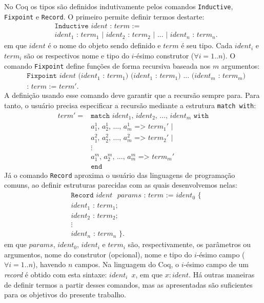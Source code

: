 No Coq os tipos são definidos indutivamente pelos comandos \texttt{Inductive}, \texttt{Fixpoint} e \texttt{Record}. O primeiro permite definir termos destarte: \begin{align*}
&\texttt{Inductive $ident$ : $term$ :=}\\ &\texttt{$ident_1$ : $term_1$ | $ident_2$ : $term_2$ | $...$ | $ident_n$ : $term_n$.}
\end{align*} em que $ident$ é o nome do objeto sendo definido e $term$ é seu tipo. Cada $ident_i$ e $term_i$ são os respectivos nome e tipo do $i$-ésimo construtor ($\forall i=1..n$). O comando \texttt{Fixpoint} define funções de forma recursiva baseada nos $m$ argumentos: \begin{align*}
&\texttt{Fixpoint $ident$ ($ident_1$ : $term_1$) ($ident_1$ : $term_1$) $...$ ($ident_m$ : $term_m$)}\\&\texttt{: $term$ := $term'$.}
\end{align*} A definição usando esse comando deve garantir que a recursão sempre para. Para tanto, o usuário precisa especificar a recursão mediante a estrutura \texttt{match with}: \begin{align*}
term' = \text{} & \texttt{match $ident_1$, $ident_2$, ..., $ident_m$ with}\\
& \texttt{$a_1^1$, $a_2^1$, $...$, $a_m^1$ => $term_1'$ |}\\
& \texttt{$a_1^2$, $a_2^2$, $...$, $a_m^2$ => $term_2'$ |}\\
& \vdots\\
& \texttt{$a_1^m$, $a_2^m$, $...$, $a_m^m$ => $term_m'$}\\
& \texttt{end}
\end{align*} Já o comando \texttt{Record} aproxima o usuário das linguagens de programação comuns, ao definir estruturas parecidas com as quais desenvolvemos nelas: \begin{align*}
&\texttt{Record $ident$ $params$ : $term$ := $ident_0$ \{}\\
&\texttt{$ident_1$ : $term_1$;}\\
&\texttt{$ident_2$ : $term_2$;}\\
&\vdots\\
&\texttt{$ident_n$ : $term_n$ \}.}
\end{align*} em que $params$, $ident_0$, $ident_i$ e $term_i$ são, respectivamente, os parâmetros ou argumentos, nome do construtor (opcional), nome e tipo do $i$-ésimo campo ($\forall i = 1..n$), havendo $n$ campos. Na linguagem do Coq, o $i$-ésimo campo de um \textit{record} é obtido com esta sintaxe: \texttt{$ident_i$ $x$}, em que $x : ident$. Há outras maneiras de definir termos a partir desses comandos, mas as apresentadas são suficientes para os objetivos do presente trabalho.

